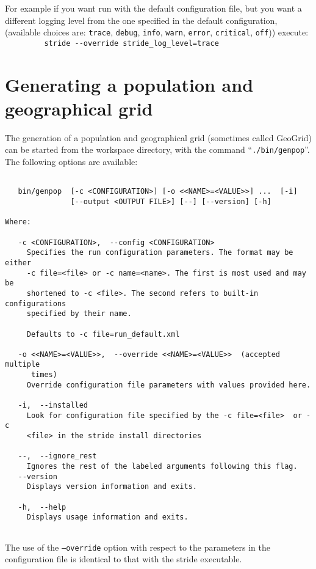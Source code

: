 For example if you want run with the default configuration file, but you
want a different logging level from the one specified in the default configuration,
(available choices are: \texttt{trace}, \texttt{debug}, \texttt{info}, \texttt{warn},
\texttt{error}, \texttt{critical}, \texttt{off})) execute:\\
\verb!         stride --override stride_log_level=trace!


\section{Generating a population and geographical grid}

 The generation of a population and geographical grid (sometimes called GeoGrid) can be started
 from the workspace directory, with the command \mbox{``\texttt{./bin/genpop}''}.
 The following options are available:
\begin{verbatim}

   bin/genpop  [-c <CONFIGURATION>] [-o <<NAME>=<VALUE>>] ...  [-i]
               [--output <OUTPUT FILE>] [--] [--version] [-h]

Where:

   -c <CONFIGURATION>,  --config <CONFIGURATION>
     Specifies the run configuration parameters. The format may be either
     -c file=<file> or -c name=<name>. The first is most used and may be
     shortened to -c <file>. The second refers to built-in configurations
     specified by their name.

     Defaults to -c file=run_default.xml

   -o <<NAME>=<VALUE>>,  --override <<NAME>=<VALUE>>  (accepted multiple
      times)
     Override configuration file parameters with values provided here.

   -i,  --installed
     Look for configuration file specified by the -c file=<file>  or -c
     <file> in the stride install directories

   --,  --ignore_rest
     Ignores the rest of the labeled arguments following this flag.
   --version
     Displays version information and exits.
 
   -h,  --help
     Displays usage information and exits.
     
\end{verbatim}

The use of the \texttt{--override} option with respect to the parameters in the configuration file is identical to
that with the stride executable.

